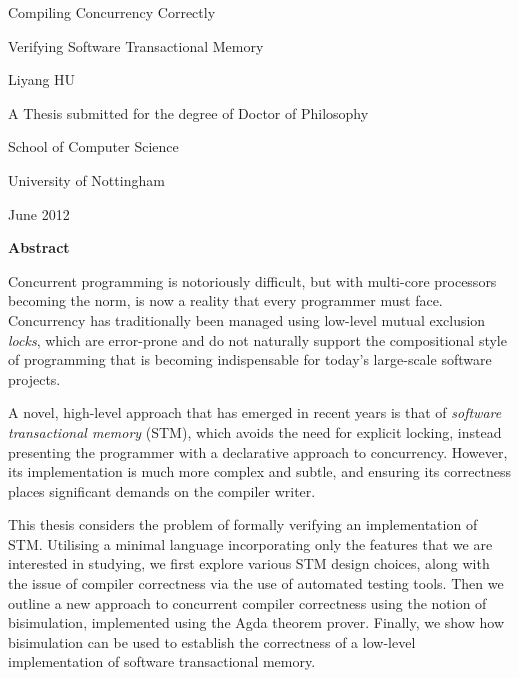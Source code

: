 \documentclass[12pt,twoside,openright]{book}
\begin{document}
\pagestyle{empty}
\begin{titlepage}
\begin{center}
\vspace*{1in}
{\LARGE Compiling Concurrency Correctly}
\par
{\Large Verifying Software Transactional Memory}
\par
\vspace{1.5in}
{\large Liyang HU}
\par
\vfill
A Thesis submitted for the degree of Doctor of Philosophy
\par
\vspace{0.5in}
School of Computer Science
\par
\vspace{0.5in}
University of Nottingham
\par
\vspace{0.5in}
June 2012
\end{center}
\cleardoublepage
\end{titlepage}


\pagestyle{fancy}

\begin{center}
{\large\bf Abstract}
\end{center}

Concurrent programming is notoriously difficult, but with multi-core
processors becoming the norm, is now a reality that every programmer must
face. Concurrency has traditionally been managed using low-level mutual
exclusion \emph{locks}, which are error-prone and do not naturally support
the compositional style of programming that is becoming indispensable for
today's large-scale software projects.

A novel, high-level approach that has emerged in recent years is that of
\emph{software transactional memory} (STM), which avoids the need for
explicit locking, instead presenting the programmer with a declarative
approach to concurrency. However, its implementation is much more complex
and subtle, and ensuring its correctness places significant demands on the
compiler writer.

This thesis considers the problem of formally verifying an implementation of
STM. Utilising a minimal language incorporating only the features that we
are interested in studying, we first explore various STM design choices,
along with the issue of compiler correctness via the use of automated
testing tools. Then we outline a new approach to concurrent compiler
correctness using the notion of bisimulation, implemented using the Agda
theorem prover. Finally, we show how bisimulation can be used to establish
the correctness of a low-level implementation of software transactional
memory.
\end{document}
